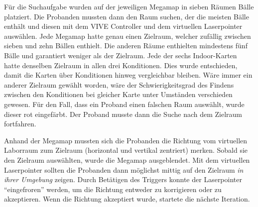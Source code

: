 Für die Suchaufgabe wurden auf der jeweiligen Megamap in sieben Räumen Bälle platziert.
Die Probanden mussten dann den Raum suchen, der die meisten Bälle enthält und diesen mit dem VIVE Controller und dem virtuellen Laserpointer auswählen.
Jede Megamap hatte genau einen Zielraum, welcher zufällig zwischen sieben und zehn Bällen enthielt.
Die anderen Räume enthielten mindestens fünf Bälle und garantiert weniger als der Zielraum.
Jede der sechs Indoor-Karten hatte denselben Zielraum in allen drei Konditionen.
Dies wurde entschieden, damit die Karten über Konditionen hinweg vergleichbar bleiben.
Wäre immer ein anderer Zielraum gewählt worden, wäre der Schwierigkeitsgrad des Findens zwischen den Konditionen bei gleicher Karte unter Umständen verschieden gewesen.
Für den Fall, dass ein Proband einen falschen Raum auswählt, wurde dieser rot eingefärbt.
Der Proband musste dann die Suche nach dem Zielraum fortfahren.

Anhand der Megamap mussten sich die Probanden die Richtung vom virtuellen Laborraum zum Zielraum (horizontal und vertikal zentriert) merken.
Sobald sie den Zielraum auswählten, wurde die Megamap ausgeblendet.
Mit dem virtuellen Laserpointer sollten die Probanden dann möglichst mittig auf den Zielraum \emph{in ihrer Umgebung} zeigen.
Durch Betätigen des Triggers konnte der Laserpointer \enquote{eingefroren} werden, um die Richtung entweder zu korrigieren oder zu akzeptieren.
Wenn die Richtung akzeptiert wurde, startete die nächste Iteration.

